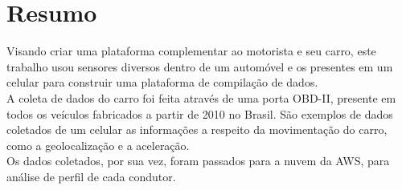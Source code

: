 \chapter*{Resumo}

\noindent Visando criar uma plataforma complementar ao motorista e seu carro, este trabalho usou sensores diversos dentro de um automóvel e os presentes em um celular para construir uma plataforma de compilação de dados.\\
A coleta de dados do carro foi feita através de uma porta OBD-II, presente em todos os veículos fabricados a partir de 2010 no Brasil. São exemplos de dados coletados de um celular as informações a respeito da movimentação do carro, como a geolocalização e a aceleração.\\ 
Os dados coletados, por sua vez, foram passados para a nuvem da AWS, para análise de perfil de cada condutor.\\ 
